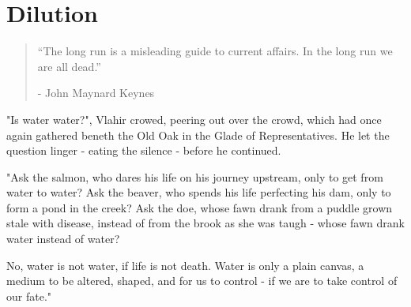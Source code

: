\chapter{Dilution}

\vspace{-1.3cm}
\begin{localsize}{10}
	\begin{quote}
		“The long run is a misleading guide to current affairs. In the long run we are all dead.” 
		\begin{flushright}- John Maynard Keynes \end{flushright}
	\end{quote} 
\end{localsize}
\vspace{1cm}





"Is water water?", Vlahir crowed, peering out over the crowd, which had once again gathered beneth the Old Oak in the Glade of Representatives. He let the question linger - eating the silence - before he continued. 

"Ask the salmon, who dares his life on his journey upstream, only to get from water to water?
 Ask the beaver, who spends his life perfecting his dam, only to form a pond in the creek?
 Ask the doe, whose fawn drank from a puddle grown stale with disease, instead of from the brook as she was taugh - whose fawn drank water instead of water?

 No, water is not water, if life is not death. Water is only a plain canvas, a medium to be altered, shaped, and for us to control - if we are to take control of our fate."

